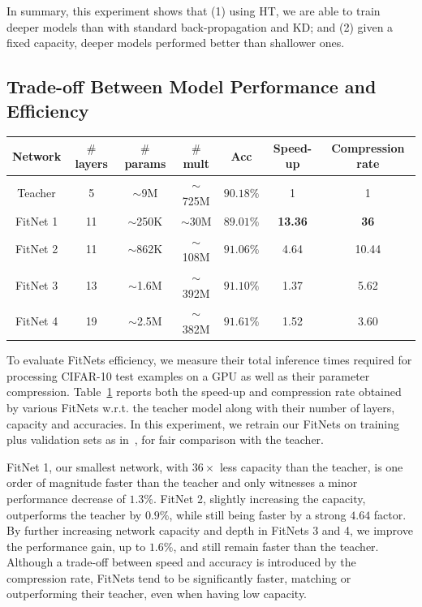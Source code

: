 \documentclass{article} %
\begin{document}
In summary, this experiment shows that (1) using HT, we are able to train deeper models
than with standard back-propagation and KD; and (2) given a fixed capacity, deeper models
performed better than shallower ones.

\vspace*{-1mm}
\subsection{Trade-off Between Model Performance and Efficiency}
\vspace*{-1mm}

\begin{table}
\centering
\small
\begin{tabular}{|c|c|c|c|c|c|c|}
 \hline
 \textbf{Network} & \textbf{$\#$ layers} & \textbf{$\#$ params} & \textbf{$\#$ mult} & \textbf{Acc} & \textbf{Speed-up} & \textbf{Compression rate}\\ \hline
\hline
Teacher   &  5 & $\sim$9M    & $\sim$725M & $90.18\%$ & 1 & 1\\ \hline
FitNet 1 & 11 & $\sim$250K  & $\sim$30M  & $89.01\%$ &  \textbf{13.36} & \textbf{36}\\ \hline
FitNet 2 & 11 & $\sim$862K  & $\sim$108M & $91.06\%$ & 4.64 & 10.44\\ \hline
FitNet 3 & 13 & $\sim$1.6M  & $\sim$392M & $91.10\%$ & 1.37 & 5.62\\ \hline
FitNet 4 & 19 & $\sim$2.5M  & $\sim$382M & $\mathbf{91.61\%}$ & 1.52 & 3.60\\ \hline
\end{tabular}
\label{tab:compression}
\end{table}

To evaluate FitNets efficiency, we measure their total inference
times required for processing CIFAR-10 test examples on a GPU as well as their parameter compression.
Table~\ref{tab:compression} reports both the speed-up and compression rate obtained
by various FitNets w.r.t. the teacher model along with their number of layers, capacity and accuracies. In this experiment, we retrain our FitNets on training plus validation sets as in~\citet{Goodfellow13}, for fair comparison with the teacher.

FitNet 1, our smallest network, with $36\times$ less capacity than the teacher, is one order of magnitude faster than the teacher and only witnesses a minor performance decrease of $1.3\%$. FitNet 2, slightly increasing the capacity, outperforms
the teacher by $0.9\%$, while still being faster by a strong $4.64$ factor.
By further increasing network capacity and depth in FitNets 3 and 4, we improve the performance gain, up to $1.6\%$, and still
remain faster than the teacher. Although a trade-off between speed and accuracy is introduced by the compression rate, FitNets tend to be significantly faster, matching or outperforming their teacher, even when having low capacity. 
\end{document}

